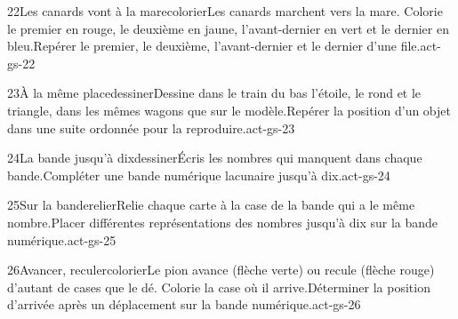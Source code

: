 \begin{activite}{22}{Les canards vont à la mare}{colorier}{Les canards marchent vers la mare. Colorie le {\otBold\color{otNavy}premier} en rouge, le {\otBold\color{otNavy}deuxième} en jaune, l’{\otBold\color{otNavy}avant-dernier} en vert et le {\otBold\color{otNavy}dernier} en bleu.}{Repérer le premier, le deuxième, l’avant-dernier et le dernier d’une file.}{act-gs-22}
\end{activite}
\begin{activite}{23}{À la même place}{dessiner}{Dessine dans le train du bas l’étoile, le rond et le triangle, {\otBold\color{otNavy}dans les mêmes wagons} que sur le modèle.}{Repérer la position d’un objet dans une suite ordonnée pour la reproduire.}{act-gs-23}
\end{activite}
\begin{activite}{24}{La bande jusqu’à dix}{dessiner}{Écris les nombres qui {\otBold\color{otNavy}manquent} dans chaque bande.}{Compléter une bande numérique lacunaire jusqu’à dix.}{act-gs-24}
\end{activite}
\begin{activite}{25}{Sur la bande}{relier}{Relie chaque carte à la case de la bande qui a le {\otBold\color{otNavy}même nombre}.}{Placer différentes représentations des nombres jusqu’à dix sur la bande numérique.}{act-gs-25}
\end{activite}
\begin{activite}{26}{Avancer, reculer}{colorier}{Le pion avance (flèche verte) ou recule (flèche rouge) d’autant de cases que le dé. Colorie la case où il {\otBold\color{otNavy}arrive}.}{Déterminer la position d’arrivée après un déplacement sur la bande numérique.}{act-gs-26}
\end{activite}
